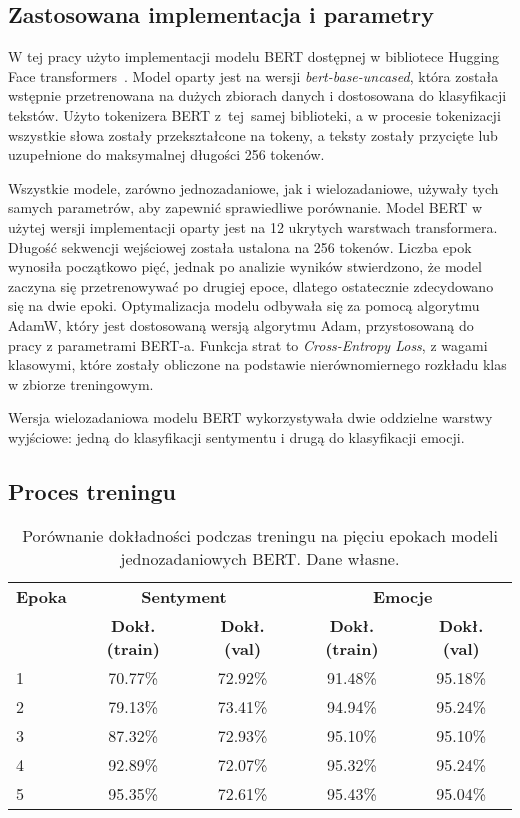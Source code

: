 \subsection{Zastosowana implementacja i parametry}

W tej pracy użyto implementacji modelu BERT dostępnej w bibliotece Hugging Face transformers~\cite{HuggingFaceDocs}. Model oparty jest na wersji \textit{bert-base-uncased}, która została wstępnie przetrenowana na dużych zbiorach danych i dostosowana do klasyfikacji tekstów. Użyto tokenizera BERT z~tej~samej biblioteki, a w procesie tokenizacji wszystkie słowa zostały przekształcone na tokeny, a teksty zostały przycięte lub uzupełnione do maksymalnej długości 256 tokenów.

Wszystkie modele, zarówno jednozadaniowe, jak i wielozadaniowe, używały tych samych parametrów, aby zapewnić sprawiedliwe porównanie. Model BERT w użytej wersji implementacji oparty jest na 12 ukrytych warstwach transformera. Długość sekwencji wejściowej została ustalona na 256 tokenów. Liczba epok wynosiła początkowo pięć, jednak po analizie wyników stwierdzono, że model zaczyna się przetrenowywać po drugiej epoce, dlatego ostatecznie zdecydowano się na dwie epoki. Optymalizacja modelu odbywała się za pomocą algorytmu AdamW, który jest dostosowaną wersją algorytmu Adam, przystosowaną do pracy z parametrami BERT-a. Funkcja strat to \textit{Cross-Entropy Loss}, z wagami klasowymi, które zostały obliczone na podstawie nierównomiernego rozkładu klas w zbiorze treningowym.

Wersja wielozadaniowa modelu BERT wykorzystywała dwie oddzielne warstwy wyjściowe: jedną do klasyfikacji sentymentu i drugą do klasyfikacji emocji. 

\subsection{Proces treningu}
\raggedbottom
\vspace{20pt}
\begin{table}[H]
\centering
\label{tab:bert_5_training_process}
\begin{tabular}{|l|c|c|c|c|}
\hline
\textbf{Epoka} & \multicolumn{2}{c|}{\textbf{Sentyment}} & \multicolumn{2}{c|}{\textbf{Emocje}} \\
\cline{2-5}
& \textbf{Dokł. (train)} & \textbf{Dokł. (val)} & \textbf{Dokł. (train)} & \textbf{Dokł. (val)} \\
\hline
1 & 70.77\% & 72.92\% & 91.48\% & 95.18\% \\
2 & 79.13\% & 73.41\% & 94.94\% & 95.24\% \\
3 & 87.32\% & 72.93\% & 95.10\% & 95.10\% \\
4 & 92.89\% & 72.07\% & 95.32\% & 95.24\% \\
5 & 95.35\% & 72.61\% & 95.43\% & 95.04\% \\
\hline
\end{tabular}
\caption{Porównanie dokładności podczas treningu na pięciu epokach modeli jednozadaniowych BERT. Dane własne.}
\end{table}

